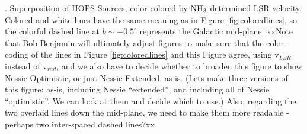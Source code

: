 \textbf{\label{fig:HOPSoverlay}}. Superposition of HOPS Sources, color-colored by ${\rm NH}_3$-determined LSR velocity.  Colored and white lines have the same meaning as in Figure \ref{fig:coloredlines}, so the colorful dashed line at $b\sim-0.5^\circ$ represents the Galactic mid-plane. xxNote that Bob Benjamin will ultimately adjust figures to make sure that the color-coding of the lines in Figure \ref{fig:coloredlines} and this Figure agree, using v$_{LSR}$ instead of v$_{rad}$, and we also have to decide whether to broaden this figure to show Nessie Optimistic, or just Nessie Extended, as-is.  (Lets make three versions of this figure: as-is, including Nessie ``extended'', and including all of Nessie ``optimistic''.  We can look at them and decide which to use.)  Also, regarding the two overlaid lines down the mid-plane, we need to make them more readable - perhaps two inter-spaced dashed lines?xx